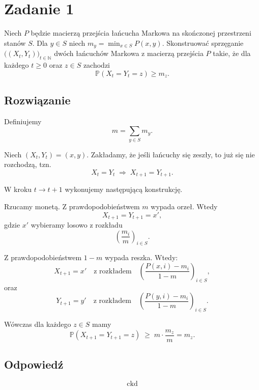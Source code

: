 \section{Zadanie 1}
Niech \(P\) będzie macierzą przejścia łańcucha Markowa na skończonej przestrzeni stanów \(S\).
Dla \(y \in S\) niech \(m_y = \min_{x \in S} P(x,y)\).
Skonstruować sprzęganie \(\bigl( (X_t, Y_t) \bigr)_{t \in \mathbb{N}}\) dwóch łańcuchów Markowa
z macierzą przejścia \(P\) takie, że dla każdego \(t \ge 0\) oraz \(z \in S\) zachodzi
\[
	\mathbb{P}(X_t = Y_t = z) \ge m_z.
\]
\subsection*{Rozwiązanie}
Definiujemy
\[
	m = \sum_{y \in S} m_y.
\]

Niech \((X_t, Y_t) = (x,y)\).
Zakładamy, że jeśli łańcuchy się zeszły, to już się nie rozchodzą, tzn.
\[
	X_t = Y_t \;\Rightarrow\; X_{t+1} = Y_{t+1}.
\]

W kroku \(t \to t+1\) wykonujemy następującą konstrukcję.

Rzucamy monetą. Z prawdopodobieństwem \(m\) wypada orzeł. Wtedy
\[
	X_{t+1} = Y_{t+1} = x',
\]
gdzie \(x'\) wybieramy losowo z rozkładu
\[
	\left( \frac{m_i}{m} \right)_{i \in S}.
\]

Z prawdopodobieństwem \(1-m\) wypada reszka. Wtedy:
\[
	X_{t+1} = x' \quad \text{z rozkładem} \quad
	\left( \frac{P(x,i) - m_i}{1-m} \right)_{i \in S},
\]
oraz
\[
	Y_{t+1} = y' \quad \text{z rozkładem} \quad
	\left( \frac{P(y,i) - m_i}{1-m} \right)_{i \in S}.
\]

Wówczas dla każdego \(z \in S\) mamy
\[
	\mathbb{P}(X_{t+1} = Y_{t+1} = z)
	\;\ge\;
	m \cdot \frac{m_z}{m}
	=
	m_z.
\]

\subsection*{Odpowiedź}
\[
	\boxed{\text{ckd}}
\]
